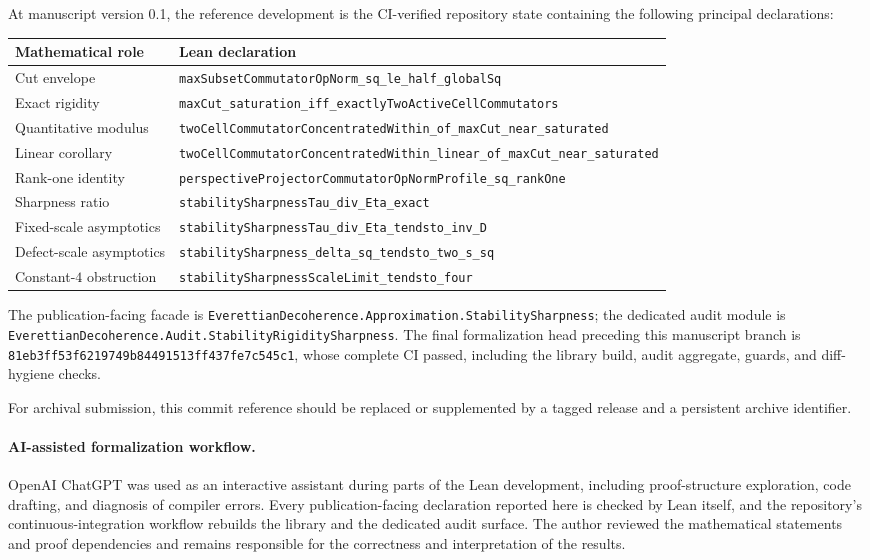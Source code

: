 \documentclass[11pt]{article}
\begin{document}
At manuscript version 0.1, the reference development is the CI-verified
repository state containing the following principal declarations:
\begin{center}
\begin{tabular}{p{}p{}}
\hline
Mathematical role & Lean declaration\\
\hline
Cut envelope &
\texttt{maxSubsetCommutatorOpNorm\_sq\_le\_half\_globalSq}\\
Exact rigidity &
\texttt{maxCut\_saturation\_iff\_exactlyTwoActiveCellCommutators}\\
Quantitative modulus &
\texttt{twoCellCommutatorConcentratedWithin\_of\_maxCut\_near\_saturated}\\
Linear corollary &
\texttt{twoCellCommutatorConcentratedWithin\_linear\_of\_maxCut\_near\_saturated}\\
Rank-one identity &
\texttt{perspectiveProjectorCommutatorOpNormProfile\_sq\_rankOne}\\
Sharpness ratio &
\texttt{stabilitySharpnessTau\_div\_Eta\_exact}\\
Fixed-scale asymptotics &
\texttt{stabilitySharpnessTau\_div\_Eta\_tendsto\_inv\_D}\\
Defect-scale asymptotics &
\texttt{stabilitySharpness\_delta\_sq\_tendsto\_two\_s\_sq}\\
Constant-$4$ obstruction &
\texttt{stabilitySharpnessScaleLimit\_tendsto\_four}\\
\hline
\end{tabular}
\end{center}

The publication-facing facade is
\texttt{EverettianDecoherence.Approximation.StabilitySharpness}; the dedicated
audit module is
\texttt{EverettianDecoherence.Audit.StabilityRigiditySharpness}.
The final formalization head preceding this manuscript branch is
\texttt{81eb3ff53f6219749b84491513ff437fe7c545c1}, whose complete CI passed,
including the library build, audit aggregate, guards, and diff-hygiene checks.

For archival submission, this commit reference should be replaced or
supplemented by a tagged release and a persistent archive identifier.

\paragraph{AI-assisted formalization workflow.}
OpenAI ChatGPT was used as an interactive assistant during parts of the Lean
development, including proof-structure exploration, code drafting, and
diagnosis of compiler errors. Every publication-facing declaration reported
here is checked by Lean itself, and the repository's continuous-integration
workflow rebuilds the library and the dedicated audit surface. The author
reviewed the mathematical statements and proof dependencies and remains
responsible for the correctness and interpretation of the results.
\end{document}
